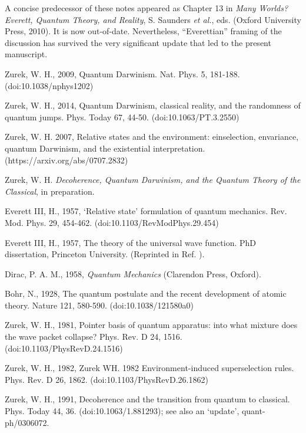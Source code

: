 \documentclass[aps,amsmath,amssymb,amsfonts,floatfix]{revtex4-1}
\newcommand{\+}         {\dagger}
\begin{document}
{{{%

\begin{references}

 A concise predecessor of these notes appeared as Chapter 13 in {\it Many Worlds? Everett, Quantum Theory, and Reality}, S. Saunders {\it et al.}, eds. (Oxford University Press, 2010). It is now out-of-date. Nevertheless, ``Everettian'' framing of the discussion has survived the very significant update that led to the present manuscript.

 Zurek, W. H., 2009, Quantum Darwinism. Nat. Phys. 5, 181-188. (doi:10.1038/nphys1202)

 Zurek, W. H., 2014, Quantum Darwinism, classical reality, and the randomness of quantum jumps. Phys. Today 67, 44-50. (doi:10.1063/PT.3.2550)

 Zurek, W. H. 2007, Relative states and the environment: einselection, envariance, quantum Darwinism, and the existential interpretation. (https://arxiv.org/abs/0707.2832)

 Zurek, W. H. {\it Decoherence, Quantum Darwinism, and the Quantum Theory of the Classical}, in preparation.

 Everett III, H., 1957, `Relative state' formulation of quantum mechanics. Rev. Mod. Phys. 29,
454-462. (doi:10.1103/RevModPhys.29.454)

 Everett III, H., 1957, The theory of the universal wave function. PhD dissertation, Princeton
University. (Reprinted in Ref. \cite{22}).

 Dirac, P. A. M., 1958, {\it Quantum Mechanics} (Clarendon Press, Oxford).

 Bohr, N., 1928, The quantum postulate and the recent development of atomic theory. Nature
121, 580-590. (doi:10.1038/121580a0)

 Zurek, W. H., 1981, Pointer basis of quantum apparatus: into what mixture does the wave packet collapse? Phys. Rev. D 24, 1516. (doi:10.1103/PhysRevD.24.1516)

 Zurek, W. H., 1982, Zurek WH. 1982 Environment-induced superselection rules. Phys. Rev. D 26, 1862.
(doi:10.1103/PhysRevD.26.1862)

 Zurek, W. H., 1991, Decoherence and the transition from quantum to classical. Phys. Today 44, 36.
(doi:10.1063/1.881293); see also
an `update', quant-ph/0306072.


\end{references}}}}
\end{document}
